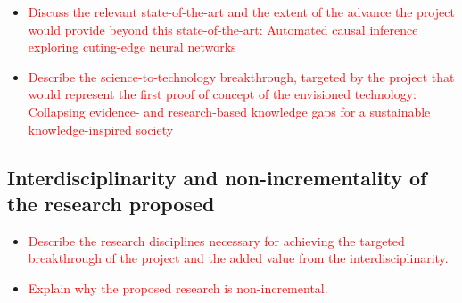\documentclass[12pt, a4paper]{article} %
\begin{document}
\begin{itemize}
\item \textcolor{red}{Discuss the relevant state-of-the-art and the extent of the
  advance the project would provide beyond this state-of-the-art:
  Automated causal inference exploring cuting-edge neural networks}
\item \textcolor{red}{Describe the science-to-technology breakthrough,
    targeted by the project that would represent the first proof of
    concept of the envisioned technology: Collapsing evidence- and
    research-based knowledge gaps for a sustainable knowledge-inspired
    society}
\end{itemize}

\subsection{Interdisciplinarity and non-incrementality of the research
  proposed}

\begin{itemize}
\item \textcolor{red}{Describe the research disciplines necessary for
    achieving the targeted breakthrough of the project and the added
    value from the interdisciplinarity.}
\item \textcolor{red}{Explain why the proposed research is
    non-incremental.}
  \end{itemize}
\end{document}
